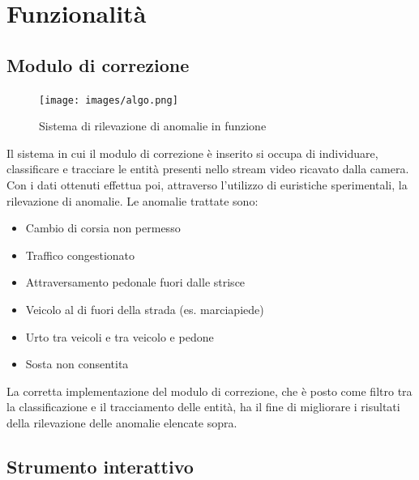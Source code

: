 \chapter{Funzionalità}
\label{sec:funzionalita}

\section{Modulo di correzione}

\begin{figure}
    \caption{Sistema di rilevazione di anomalie in funzione}
    \label{fig:anomalie}
    \centering
    \texttt{[image: images/algo.png]}
\end{figure}

Il sistema in cui il modulo di correzione è inserito si occupa di individuare, classificare e tracciare le entità presenti nello stream video ricavato dalla camera.
Con i dati ottenuti effettua poi, attraverso l'utilizzo di euristiche sperimentali, la rilevazione di anomalie.
Le anomalie trattate sono:
\begin{itemize}
    \item Cambio di corsia non permesso
    \item Traffico congestionato
    \item Attraversamento pedonale fuori dalle strisce 
    \item Veicolo al di fuori della strada (es. marciapiede) %
    \item Urto tra veicoli e tra veicolo e pedone
    \item Sosta non consentita
\end{itemize}
La corretta implementazione del modulo di correzione, che è posto come filtro tra la classificazione e il tracciamento delle entità, ha il fine di migliorare i risultati della rilevazione delle anomalie elencate sopra.

\section{Strumento interattivo}

